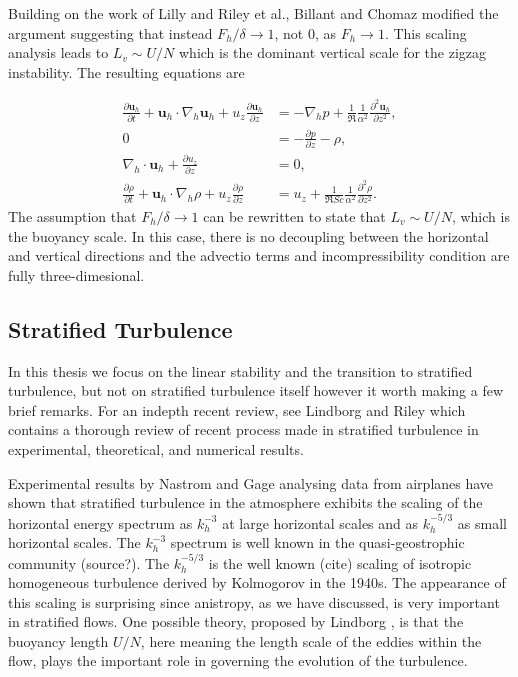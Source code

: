 Building on the work of Lilly \cite{lilly1983} and Riley et al.\cite{rileylelong2000}, Billant and Chomaz \cite{bc2001} modified the argument suggesting that instead $F_{h}/\delta\rightarrow 1$, not $0$, as $F_{h}\rightarrow 1$. This scaling analysis leads to $L_{v} \sim U/N$ which is the dominant vertical scale for the zigzag instability. The resulting equations are

\begin{align}
\frac{\partial \textbf{u}_{h}}{\partial t} + \textbf{u}_{h}\cdot\nabla_{h}\textbf{u}_{h}+u_{z}\frac{\partial \textbf{u}_{h}}{\partial z} &= -\nabla_{h}p + \frac{1}{\Re}\frac{1}{\alpha^{2}}\frac{\partial^{2}\textbf{u}_{h}}{\partial z^{2}},\\
0&= -\frac{\partial p}{\partial z} - \rho, \\
\nabla_{h}\cdot\textbf{u}_{h}+ \frac{\partial u_{z}}{\partial z} &=0,\\
\frac{\partial \rho}{\partial t} + \textbf{u}_{h}\cdot\nabla_{h}\rho + u_{z}\frac{\partial \rho}{\partial z} &= u_{z} + \frac{1}{\Re Sc}\frac{1}{\alpha^{2}}\frac{\partial^{2}\rho}{\partial z^{2}}. 
\end{align} 
The assumption that $F_{h}/\delta \rightarrow 1$ can be rewritten to state that $L_{v} \sim U/N$, which is the buoyancy scale. In this case, there is no decoupling between the horizontal and vertical directions and the advectio terms and incompressibility condition are fully three-dimesional. 

\subsection{Stratified Turbulence}
In this thesis we focus on the linear stability and the transition to stratified turbulence, but not on stratified turbulence itself however it worth making a few brief remarks. For an indepth recent review, see Lindborg and Riley \cite{rileylindborg2013} which contains a thorough review of recent process made in stratified turbulence in experimental, theoretical, and numerical results.

Experimental results by Nastrom and Gage \cite{nastrom1985} analysing data from airplanes have shown that stratified turbulence in the atmosphere exhibits the scaling of the horizontal energy spectrum as $k_{h}^{-3}$ at large horizontal scales and as $k_{h}^{-5/3}$ as small horizontal scales. The $k_{h}^{-3}$ spectrum is well known in the quasi-geostrophic community (source?). The $k_{h}^{-5/3}$ is the well known (cite) scaling of isotropic homogeneous turbulence derived by Kolmogorov in the 1940s. The appearance of this scaling is surprising since anistropy, as we have discussed, is very important in stratified flows. One possible theory, proposed by Lindborg \cite{lindborg2006}, is that the buoyancy length $U/N$, here meaning the length scale of the eddies within the flow, plays the important role in governing the evolution of the turbulence. 



